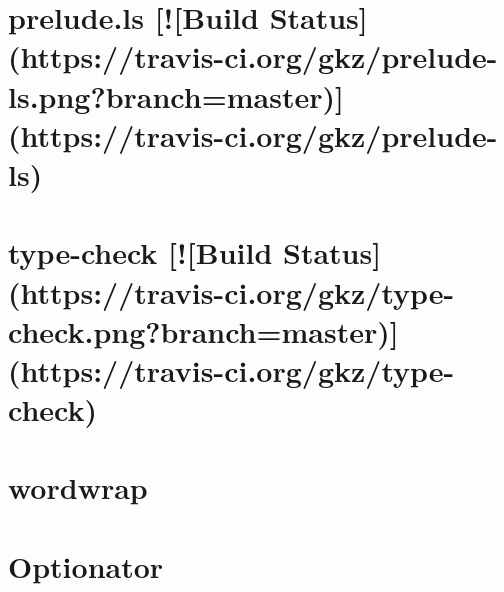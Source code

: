 \documentclass[twoside]{book}
\newcommand{\+}{\discretionary{\mbox{\scriptsize$\hookleftarrow$}}{}{}}
\begin{document}
\chapter{prelude.\+ls \mbox{[}!\mbox{[}Build Status\mbox{]}(https\+://travis-\/ci.org/gkz/prelude-\/ls.png?branch=master)\mbox{]}(https\+://travis-\/ci.org/gkz/prelude-\/ls)}
\label{md__c_1__users_martin__documents__git_hub_visual_studio__bachelor__wis_r__wis_r_node_modules_istff6cebfb18b6b24497d15853ad822634}
\hypertarget{md__c_1__users_martin__documents__git_hub_visual_studio__bachelor__wis_r__wis_r_node_modules_istff6cebfb18b6b24497d15853ad822634}{}

\chapter{type-\/check \mbox{[}!\mbox{[}Build Status\mbox{]}(https\+://travis-\/ci.org/gkz/type-\/check.png?branch=master)\mbox{]}(https\+://travis-\/ci.org/gkz/type-\/check)}
\label{md__c_1__users_martin__documents__git_hub_visual_studio__bachelor__wis_r__wis_r_node_modules_ist871307116bbac826f0f356ad233b1b2b}
\hypertarget{md__c_1__users_martin__documents__git_hub_visual_studio__bachelor__wis_r__wis_r_node_modules_ist871307116bbac826f0f356ad233b1b2b}{}

\chapter{wordwrap}
\label{md__c_1__users_martin__documents__git_hub_visual_studio__bachelor__wis_r__wis_r_node_modules_ist9efc687557c96f85e0be8686162dc0fd}
\hypertarget{md__c_1__users_martin__documents__git_hub_visual_studio__bachelor__wis_r__wis_r_node_modules_ist9efc687557c96f85e0be8686162dc0fd}{}

\chapter{Optionator}
\label{md__c_1__users_martin__documents__git_hub_visual_studio__bachelor__wis_r__wis_r_node_modules_ist2fbd6a4d5d2f145dfb0a3cea45ee2ecb}
\hypertarget{md__c_1__users_martin__documents__git_hub_visual_studio__bachelor__wis_r__wis_r_node_modules_ist2fbd6a4d5d2f145dfb0a3cea45ee2ecb}{}

\end{document}
